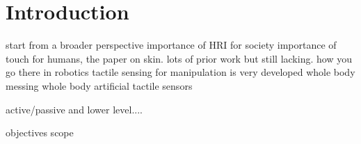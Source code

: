 \chapter{Introduction}
\label{introchap}

start from a broader perspective
importance of HRI for society
importance of touch for humans, the paper on skin.
lots of prior work but still lacking. how you go there in robotics
tactile sensing for manipulation is very developed
whole body messing
whole body artificial tactile sensors

active/passive and lower level....

objectives scope
